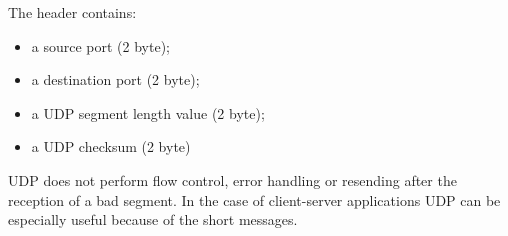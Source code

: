 \documentclass[margin=0px]{article}
\begin{document}
\begin{description}
\begin{itemize}
                  The header contains:
                  \begin{itemize}
                      \item a source port (2 byte);
                      \item a destination port (2 byte);
                      \item a UDP segment length value (2 byte);
                      \item a UDP checksum (2 byte)
                  \end{itemize}
                  UDP does not perform flow control, error handling or resending after the reception of a bad segment. In the case of client-server applications UDP can be especially useful because of the short messages.
        \end{itemize}
\end{description}
\end{document}
